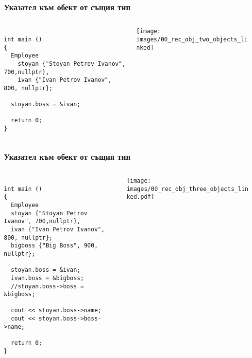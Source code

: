 \documentclass{beamer}
\begin{document}
\begin{frame}[fragile]
\frametitle{Указател към обект от същия тип}

\begin{columns}[c]
  \begin{column}{0.55\textwidth}
\begin{flushleft}
\begin{lstlisting}

int main ()
{
  Employee 
    stoyan {"Stoyan Petrov Ivanov", 700,nullptr},
    ivan {"Ivan Petrov Ivanov", 800, nullptr};

  stoyan.boss = &ivan;

  return 0;
}

\end{lstlisting}  
\end{flushleft}

  \end{column}
  \begin{column}{0.45\textwidth}
\hspace{-100px}
\texttt{[image: images/00\_rec\_obj\_two\_objects\_linked]}

  \end{column}
\end{columns}
\end{frame}




\begin{frame}[fragile]
\frametitle{Указател към обект от същия тип}

\begin{columns}[c]
  \begin{column}{0.55\textwidth}
\begin{flushleft}
\begin{lstlisting}

int main ()
{
  Employee 
  stoyan {"Stoyan Petrov Ivanov", 700,nullptr},
  ivan {"Ivan Petrov Ivanov", 800, nullptr};
  bigboss {"Big Boss", 900, nullptr};

  stoyan.boss = &ivan;
  ivan.boss = &bigboss;
  //stoyan.boss->boss = &bigboss;
  
  cout << stoyan.boss->name;
  cout << stoyan.boss->boss->name;

  return 0;
}

\end{lstlisting}  
\end{flushleft}

  \end{column}
  \begin{column}{0.45\textwidth}
\hspace{-150px}
\texttt{[image: images/00\_rec\_obj\_three\_objects\_linked.pdf]}

  \end{column}
\end{columns}
\end{frame}
\end{document}
